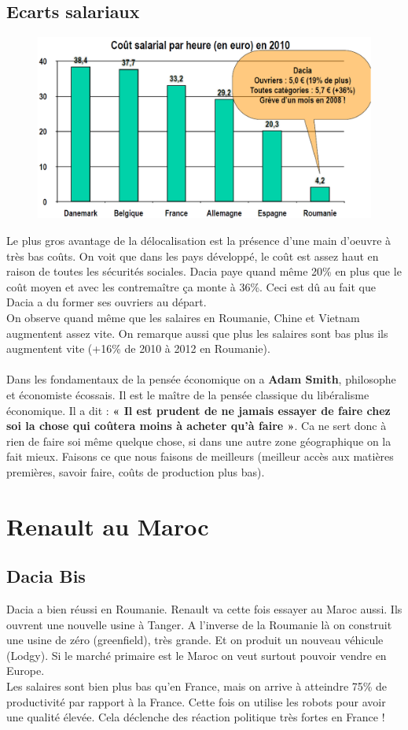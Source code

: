 \subsection{Ecarts salariaux}
\begin{figure}
\includegraphics[scale=0.3]{58}
\end{figure}
Le plus gros avantage de la délocalisation est la présence d'une main d'oeuvre à très bas coûts. On voit que dans les pays développé, le coût est assez haut en raison de toutes les sécurités sociales. Dacia paye quand même 20\% en plus que le coût moyen et avec les contremaître ça monte à 36\%. Ceci est dû au fait que Dacia a du former ses ouvriers au départ. 
\\
On observe quand même que les salaires en Roumanie, Chine et Vietnam augmentent assez vite. On remarque aussi que plus les salaires sont bas plus ils augmentent vite (+16\% de 2010 à 2012 en Roumanie).
\\\\
Dans les fondamentaux de la pensée économique on a \textbf{Adam Smith}, philosophe et économiste écossais. Il est le maître de la pensée classique du libéralisme économique. Il a dit : \textbf{« Il est prudent de ne jamais essayer de faire chez soi la
chose qui coûtera moins à acheter qu’à faire »}. Ca ne sert donc à rien de faire soi même quelque chose, si dans une autre zone géographique on la fait mieux. Faisons ce que nous faisons de meilleurs (meilleur accès aux matières premières, savoir faire, coûts de production plus bas).

\section{Renault au Maroc}
\subsection{Dacia Bis}
Dacia a bien réussi en Roumanie. Renault va cette fois essayer au Maroc aussi. Ils ouvrent une nouvelle usine à Tanger. A l'inverse de la Roumanie là on construit une usine de zéro (greenfield), très grande. Et on produit un nouveau véhicule (Lodgy). Si le marché primaire est le Maroc on veut surtout pouvoir vendre en Europe. \\
Les salaires sont bien plus bas qu'en France, mais on arrive à atteindre 75\% de productivité par rapport à la France. Cette fois on utilise les robots pour avoir une qualité élevée. Cela déclenche des réaction politique très fortes en France !

